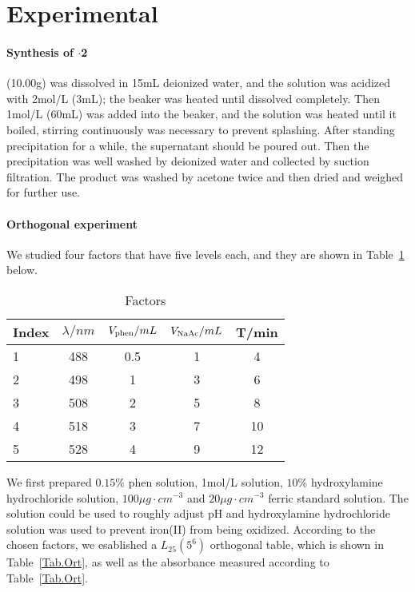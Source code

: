 \ifx\SUM\undefined


\fi

\section{Experimental}
\paragraph{Synthesis of $\cdot$2}
 (10.00g) was dissolved in 15mL deionized water, and the solution was acidized with 2mol/L  (3mL); the beaker was heated until  dissolved completely. Then 1mol/L  (60mL) was added into the beaker, and the solution was heated until it boiled, stirring continuously was necessary to prevent splashing. After standing precipitation for a while, the supernatant should be poured out. Then the precipitation was well washed by deionized water and collected by suction filtration. The product was washed by acetone twice and then dried and weighed for further use.
\paragraph{Orthogonal experiment}
 We studied four factors that have five levels each, and they are shown in Table~\ref{Tab.Fac} below.
\begin{table}[H]
  \caption{Factors}
  \label{Tab.Fac}
  \begin{tabular}{lcccc}
    \toprule
    Index & $\lambda /nm$ & $V_{\ce{phen}}/mL$ & $V_{\ce{NaAc}}/mL$ & T/min\\
    \midrule
    1     & 488           & 0.5                & 1                  & 4    \\
    2     & 498           & 1                  & 3                  & 6    \\
    3     & 508           & 2                  & 5                  & 8    \\
    4     & 518           & 3                  & 7                  & 10   \\
    5     & 528           & 4                  & 9                  & 12   \\
    \bottomrule
  \end{tabular}
\end{table}

We first prepared $0.15\%$ phen solution, 1mol/L  solution, $10\%$ hydroxylamine hydrochloride solution, $100\mu g\cdot cm^{-3}$  and $20\mu g\cdot cm^{-3}$ ferric standard solution. The  solution could be used to roughly adjust pH and hydroxylamine hydrochloride solution was used to prevent iron(II) from being oxidized. According to the chosen factors, we esablished a $L_{25}(5^6)$ orthogonal table, which is shown in Table~\ref{Tab.Ort}, as well as the absorbance measured according to Table~\ref{Tab.Ort}.

